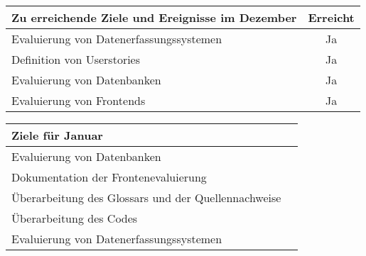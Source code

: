 \begin{tabularx}{\textwidth}{Xc}
    \arrayrulecolor{OliveGreen}
    \toprule
    {\bfseries Zu erreichende Ziele und Ereignisse im Dezember} & {\bfseries Erreicht} \\
    \midrule[2pt]
    Evaluierung von Datenerfassungssystemen                     &Ja                    \\
    \rowcolor{OliveGreen!15}
    Definition von Userstories                                  &Ja                    \\
    \rowcolor{White}
    Evaluierung von Datenbanken                                 &Ja                    \\
    \rowcolor{OliveGreen!15}
    Evaluierung von Frontends                                   &Ja                    \\
    \bottomrule[2pt]
\end{tabularx}
%
\vspace{1cm}
%
\begin{tabularx}{\textwidth}{Xc}
    \arrayrulecolor{OliveGreen}
    \toprule
    {\bfseries Ziele für Januar}                         &                      \\
    \midrule[2pt]
    Evaluierung von Datenbanken                          &                      \\
    \rowcolor{OliveGreen!15}
    Dokumentation der Frontenevaluierung                 &                      \\
    \rowcolor{White}
    Überarbeitung des Glossars und der Quellennachweise  &                      \\
    \rowcolor{OliveGreen!15}
    Überarbeitung des \latex{} Codes                     &                      \\
    \rowcolor{White}
    Evaluierung von Datenerfassungssystemen              &                      \\
\end{tabularx}
